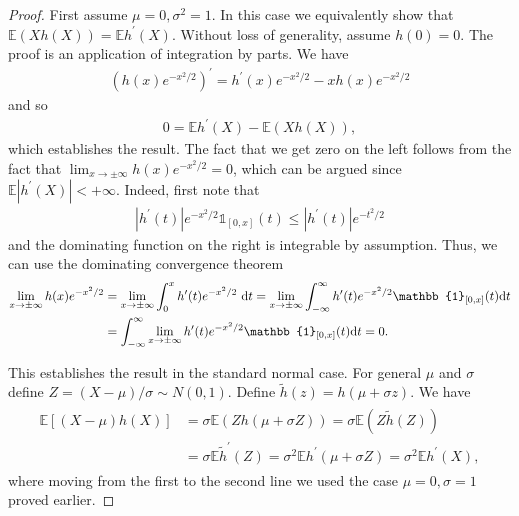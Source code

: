 \begin{proof}
   First assume $\mu=0, \sigma^2=1$. In this case we equivalently show that $\mathbb{E}(X h(X))=\mathbb{E} h^{\prime}(X)$. Without loss of generality, assume $h(0)=0$. The proof is an application of integration by parts. We have
\begin{align*}
\left(h(x) e^{-x^2 / 2}\right)^{\prime}=h^{\prime}(x) e^{-x^2 / 2}-x h(x) e^{-x^2 / 2}
\end{align*}
and so
\begin{align*}
0=\mathbb{E} h^{\prime}(X)-\mathbb{E}(X h(X)),
\end{align*}
which establishes the result. The fact that we get zero on the left follows from the fact that $\lim _{x \rightarrow \pm \infty} h(x) e^{-x^2 / 2}=0$, which can be argued since $\mathbb{E}\left|h^{\prime}(X)\right|<+\infty$. Indeed, first note that
\begin{align*}
\left|h^{\prime}(t)\right| e^{-x^2 / 2} \mathbb{1}_{[0, x]}(t) \leq\left|h^{\prime}(t)\right| e^{-t^2 / 2}
\end{align*}
and the dominating function on the right is integrable by assumption. Thus, we can use the dominating convergence theorem
\begin{align*}
\begin{aligned}
\lim _{x \rightarrow \pm \infty} h(x) e^{-x^2 / 2} & =\lim _{x \rightarrow \pm \infty} \int_0^x h^{\prime}(t) e^{-x^2 / 2} \mathrm{~d} t=\lim _{x \rightarrow \pm \infty} \int_{-\infty}^{\infty} h^{\prime}(t) e^{-x^2 / 2} \mathbb{1}_{[0, x]}(t)\d t \\
& =\int_{-\infty}^{\infty} \lim _{x \rightarrow \pm \infty} h^{\prime}(t) e^{-x^2 / 2} \mathbb{1}_{[0, x]}(t) \mathrm{d} t=0 .
\end{aligned}
\end{align*}


This establishes the result in the standard normal case. For general $\mu$ and $\sigma$ define $Z=(X-\mu) / \sigma \sim N(0,1)$. Define $\tilde{h}(z)=h(\mu+\sigma z)$. We have
\begin{align*}
\begin{aligned}
\mathbb{E}[(X-\mu) h(X)] & =\sigma \mathbb{E}(Z h(\mu+\sigma Z))=\sigma \mathbb{E}(Z \tilde{h}(Z)) \\
& =\sigma \mathbb{E} \tilde{h}^{\prime}(Z)=\sigma^2 \mathbb{E} h^{\prime}(\mu+\sigma Z)=\sigma^2 \mathbb{E} h^{\prime}(X),
\end{aligned}
\end{align*}
where moving from the first to the second line we used the case $\mu=0, \sigma=1$ proved earlier. 
\end{proof}


